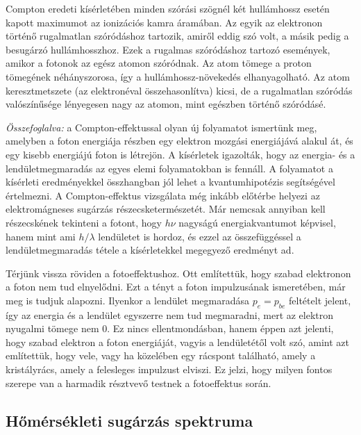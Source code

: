 \documentclass[../main.tex]{subfiles}
\begin{document}
Compton eredeti kísérletében minden szórási szögnél két hullámhossz esetén kapott maximumot az ionizációs kamra áramában. Az egyik az elektronon történő rugalmatlan szóródáshoz tartozik, amiről eddig szó volt, a másik pedig a besugárzó hullámhosszhoz. Ezek a rugalmas szóródáshoz tartozó események, amikor a fotonok az egész atomon szóródnak. Az atom tömege a proton tömegének néhányszorosa, így a hullámhossz-növekedés elhanyagolható.
Az atom keresztmetszete (az elektronéval összehasonlítva) kicsi, de a rugalmatlan szóródás valószínűsége lényegesen nagy az atomon, mint egészben történő szóródásé.

\textit{Összefoglalva:} a Compton-effektussal olyan új folyamatot ismertünk meg, amelyben a foton energiája részben egy elektron mozgási energiájává alakul át, és egy kisebb energiájú foton is létrejön. A kísérletek igazolták, hogy az energia- és a lendületmegmaradás az egyes elemi folyamatokban is fennáll.
A folyamatot a kísérleti eredményekkel összhangban jól lehet a kvantumhipotézis segítségével értelmezni. A Compton-effektus vizsgálata még inkább előtérbe helyezi az elektromágneses sugárzás részecsketermészetét. Már nemcsak annyiban kell részecskének tekinteni a fotont, hogy $h\nu$ nagyságú energiakvantumot képvisel, hanem mint ami $h/\lambda$ lendületet is hordoz, és ezzel az összefüggéssel a lendületmegmaradás tétele a kísérletekkel megegyező eredményt ad.

Térjünk vissza röviden a fotoeffektushoz. Ott említettük, hogy szabad elektronon a foton nem tud elnyelődni. Ezt a tényt a foton impulzusának ismeretében, már meg is tudjuk alapozni. Ilyenkor a lendület megmaradása 
$p_e = p_{be}$
feltételt jelent, így az energia és a lendület egyszerre nem tud megmaradni, mert az elektron nyugalmi tömege nem 0. Ez nincs ellentmondásban, hanem éppen azt jelenti, hogy szabad elektron a foton energiáját, vagyis a lendületétől volt szó, amint azt említettük, hogy vele, vagy ha közelében egy rácspont található, amely a kristályrács, amely a felesleges impulzust elviszi. Ez jelzi, hogy milyen fontos szerepe van a harmadik résztvevő testnek a fotoeffektus során.

\subsection{Hőmérsékleti sugárzás spektruma}
\end{document}
